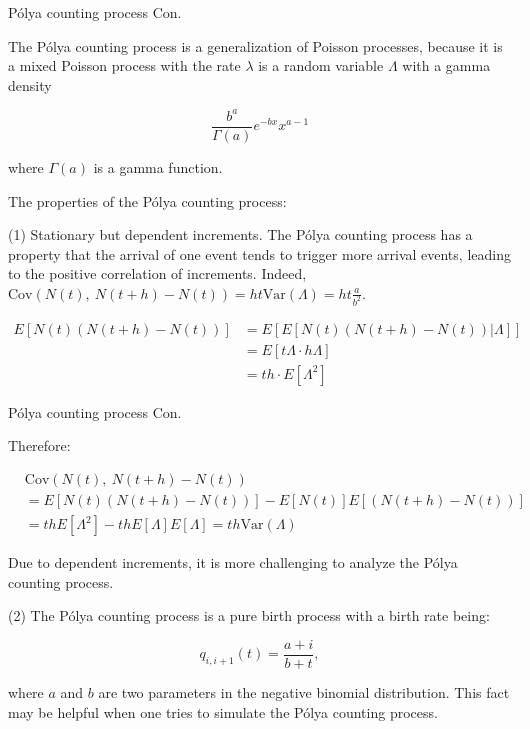 \documentclass{beamer}
\begin{document}
\begin{frame}{Pólya counting process Con.}

    {\footnotesize \footnotesize
    \par The Pólya counting process is a generalization of Poisson processes, because it is a mixed Poisson process with the rate \( \lambda \) is a random variable \( \Lambda \) with a gamma density

    \[
    \frac{b^a}{\Gamma(a)} e^{-bx}x^{a-1}
    \]

    \par where \( \Gamma(a) \) is a gamma function.
    
    \vspace{1em}
    \par The properties of the Pólya counting process:
    \vspace{1em}
    \par (1) Stationary but dependent increments. The Pólya counting process
    has a property that the arrival of one event tends to trigger more arrival events,
    leading to the positive correlation of increments. Indeed, $\text{Cov}(N(t),\ N(t+h)-N(t)) = ht\text{Var}(\Lambda) = ht\frac{a}{b^{2}}.$
    \par [Proof]
    \begin{align*}
        E[N(t)(N(t+h)-N(t))] &= E[E[N(t)(N(t+h)-N(t))|\Lambda]]\\ 
        &= E[t\Lambda\cdot h\Lambda]\\&= th\cdot E[\Lambda^{2}]
    \end{align*}

    }
    
\end{frame}

\begin{frame}{Pólya counting process Con.}

    {\footnotesize \footnotesize
    \par Therefore:

    \[
    \begin{aligned}
    &\text{Cov}(N(t),\ N(t+h)-N(t)) \\
    &= E[N(t)(N(t+h)-N(t))]-E[N(t)]E[(N(t+h)-N(t))] \\
    &= thE[\Lambda^{2}]-thE[\Lambda]E[\Lambda] = th\text{Var}(\Lambda)
    \end{aligned}
    \]
    \par Due to dependent increments, it is more challenging to analyze the Pólya counting process.
    \vspace{1em}
    \par (2) The Pólya counting process is a pure birth process with a birth rate being:

    \[
    q_{i,i+1}(t) = \frac{a+i}{b+t},
    \]

    \par where \(a\) and \(b\) are two parameters in the negative binomial distribution. 
    This fact may be helpful when one tries to simulate the Pólya counting process.
    

    }
    
\end{frame}
\end{document}
